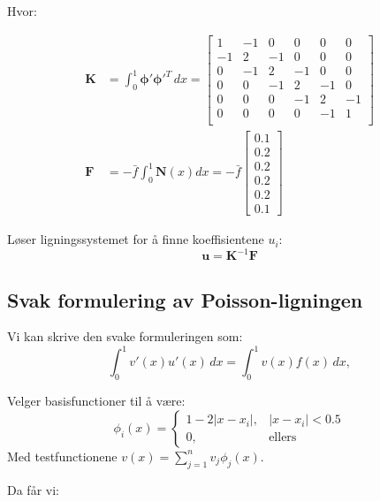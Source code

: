 Hvor:

\begin{align*}
	\symbf{K} & = \int_0^1 \symbf{\phi}' \symbf{\phi}'^T \, dx =
	\begin{bmatrix}
		1  & -1 & 0  & 0  & 0  & 0  \\
		-1 & 2  & -1 & 0  & 0  & 0  \\
		0  & -1 & 2  & -1 & 0  & 0  \\
		0  & 0  & -1 & 2  & -1 & 0  \\
		0  & 0  & 0  & -1 & 2  & -1 \\
		0  & 0  & 0  & 0  & -1 & 1  \\
	\end{bmatrix}                                  \\
	\symbf{F} & = - \bar{f} \int_0^1 \symbf{N}(x) dx
	= - \bar{f}
	\begin{bmatrix}
		0.1 \\ 0.2 \\ 0.2 \\ 0.2 \\ 0.2 \\ 0.1
	\end{bmatrix}
\end{align*}

Løser ligningssystemet for å finne koeffisientene \(u_i\):
\[
	\symbf{u} = \symbf{K}^{-1} \symbf{F}
\]


\subsection{Svak formulering av Poisson-ligningen}
Vi kan skrive den svake formuleringen som:
\[
	\int_0^1 v'(x) u'(x) \, dx = \int_0^1 v(x) f(x) \, dx,
\]

Velger \gls{basisfunction}er til å være:
\[
	\phi_i(x) = \begin{cases}
		1 - 2|x - x_i|, & |x - x_i| < 0.5 \\
		0,              & \text{ellers}
	\end{cases}
\]
Med \gls{testfunction}ene \(v(x) = \sum_{j=1}^n v_j \phi_j(x)\).

Da får vi:

